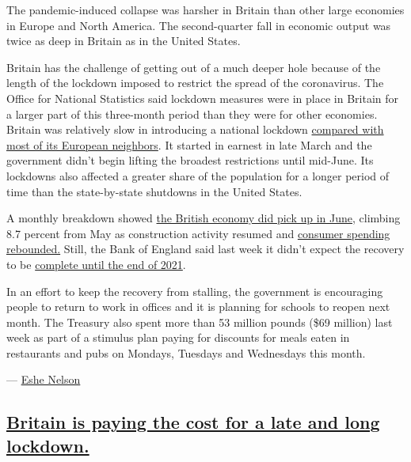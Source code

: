 The pandemic-induced collapse was harsher in Britain than other large
economies in Europe and North America. The second-quarter fall in
economic output was twice as deep in Britain as in the United States.

Britain has the challenge of getting out of a much deeper hole because
of the length of the lockdown imposed to restrict the spread of the
coronavirus. The Office for National Statistics said lockdown measures
were in place in Britain for a larger part of this three-month period
than they were for other economies. Britain was relatively slow in
introducing a national lockdown
\href{https://www.politico.eu/article/europes-coronavirus-lockdown-measures-compared/}{compared
with most of its European neighbors}. It started in earnest in late
March and the government didn't begin lifting the broadest restrictions
until mid-June. Its lockdowns also affected a greater share of the
population for a longer period of time than the state-by-state shutdowns
in the United States.

A monthly breakdown showed
\href{https://www.ons.gov.uk/economy/grossdomesticproductgdp/bulletins/gdpmonthlyestimateuk/june2020}{the
British economy did pick up in June}, climbing 8.7 percent from May as
construction activity resumed and
\href{https://www.nytimes3xbfgragh.onion/live/2020/07/24/business/stock-market-updates-coronavirus\#british-retail-sales-see-a-v-shaped-recovery-but-it-may-not-last}{consumer
spending rebounded.} Still, the Bank of England said last week it didn't
expect the recovery to be
\href{https://www.nytimes3xbfgragh.onion/2020/08/06/business/britains-economy-wont-fully-recover-till-end-of-2021-its-central-bankers-said.html}{complete
until the end of 2021}.

In an effort to keep the recovery from stalling, the government is
encouraging people to return to work in offices and it is planning for
schools to reopen next month. The Treasury also spent more than 53
million pounds (\$69 million) last week as part of a stimulus plan
paying for discounts for meals eaten in restaurants and pubs on Mondays,
Tuesdays and Wednesdays this month.

--- \href{https://www.nytimes3xbfgragh.onion/by/eshe-nelson}{Eshe
Nelson}

\hypertarget{britain-is-paying-the-cost-for-a-late-and-long-lockdown}{%
\subsection{\texorpdfstring{\protect\hyperlink{britain-is-paying-the-cost-for-a-late-and-long-lockdown}{Britain
is paying the cost for a late and long
lockdown.}}{Britain is paying the cost for a late and long lockdown.}}\label{britain-is-paying-the-cost-for-a-late-and-long-lockdown}}

